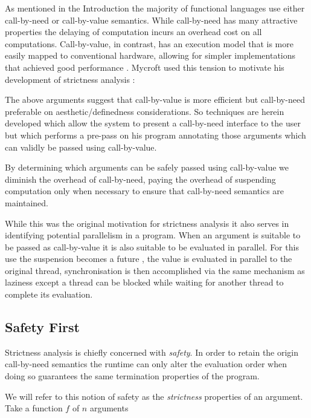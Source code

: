 As mentioned in the Introduction  the majority of
functional languages use either call-by-need or call-by-value semantics.  While
call-by-need has many attractive properties the delaying of computation incurs
an overhead cost on all computations. Call-by-value, in contrast, has an
execution model that is more easily mapped to conventional hardware, allowing
for simpler implementations that achieved good performance . Mycroft used this tension to motivate his development of strictness
analysis :

\begin{displayquote}

The above arguments suggest that call-by-value is more efficient but
call-by-need preferable on aesthetic/definedness considerations. So techniques
are herein developed which allow the system to present a call-by-need interface
to the user but which performs a pre-pass on his program annotating those
arguments which can validly be passed using call-by-value.

\end{displayquote}

By determining which arguments can be safely passed using call-by-value
we diminish the overhead of call-by-need, paying the overhead of
suspending computation only when necessary to ensure that call-by-need
semantics are maintained.

While this was the original motivation for strictness analysis it also serves
in identifying potential parallelism in a program. When an argument is suitable
to be passed as call-by-value it is also suitable to be evaluated in parallel.
For this use the suspension becomes a future , the value is
evaluated in parallel to the original thread, synchronisation is then
accomplished via the same mechanism as laziness except a thread can be blocked
while waiting for another thread to complete its evaluation.

\subsection{Safety First}

Strictness analysis is chiefly concerned with \emph{safety}. In order to retain
the origin call-by-need semantics the runtime can only alter the evaluation order
when doing so guarantees the same termination properties of the program.

We will refer to this notion of safety as the \emph{strictness} properties
of an argument. Take a function $f$ of $n$ arguments

